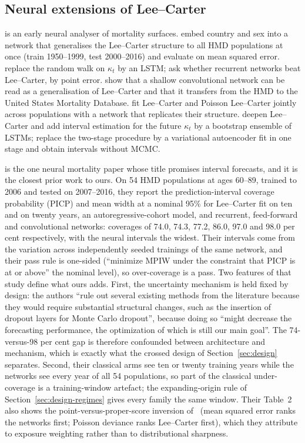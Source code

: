 \subsection{Neural extensions of Lee--Carter}

\citet{hainaut2018neural} is an early neural analyser of mortality surfaces.
\citet{richman2021neural} embed country and sex into a network that
generalises the Lee--Carter structure to all HMD populations at once (train
1950--1999, test 2000--2016) and evaluate on mean squared error.
\citet{nigri2019deep} replace the random walk on $\kappa_t$ by an LSTM;
\citet{petnehazi2019mortality} ask whether recurrent networks beat
Lee--Carter, by point error. \citet{perla2021time} show that a shallow
convolutional network can be read as a generalisation of Lee--Carter and
that it transfers from the HMD to the United States Mortality Database.
\citet{scognamiglio2022calibrating} fit Lee--Carter and Poisson Lee--Carter
jointly across populations with a network that replicates their structure.
\citet{marino2023neural} deepen Lee--Carter and add interval estimation
for the future $\kappa_t$ by a bootstrap ensemble of LSTMs;
\citet{miyata2022extending} replace the two-stage procedure by a
variational autoencoder fit in one stage and obtain intervals without MCMC.

\citet{schnurch2022point} is the one neural mortality paper whose title
promises interval forecasts, and it is the closest prior work to ours. On
54 HMD populations at ages 60--89, trained to 2006 and tested on
2007--2016, they report the prediction-interval coverage probability (PICP)
and mean width at a nominal 95\% for Lee--Carter fit on ten and on twenty
years, an autoregressive-cohort model, and recurrent, feed-forward and
convolutional networks: coverages of 74.0, 74.3, 77.2, 86.0, 97.0 and 98.0
per cent respectively, with the neural intervals the widest. Their
intervals come from the variation across independently seeded trainings of
the same network, and their pass rule is one-sided (``minimize MPIW under
the constraint that PICP is at or above'' the nominal level), so
over-coverage is a pass. Two features of that study define what ours adds.
First, the uncertainty mechanism is held fixed by design: the authors
``rule out several existing methods from the literature because they would
require substantial structural changes, such as the insertion of dropout
layers for Monte Carlo dropout'', because doing so ``might decrease the
forecasting performance, the optimization of which is still our main
goal''. The 74-versus-98 per cent gap is therefore confounded between
architecture and mechanism, which is exactly what the crossed design of
Section~\ref{sec:design} separates. Second, their classical arms see ten or
twenty training years while the networks see every year of all 54
populations, so part of the classical under-coverage is a training-window
artefact; the expanding-origin rule of Section~\ref{sec:design-regimes}
gives every family the same window. Their Table~2 also shows the
point-versus-proper-score inversion of \Hone\ (mean squared error ranks the
networks first; Poisson deviance ranks Lee--Carter first), which they
attribute to exposure weighting rather than to distributional sharpness.

